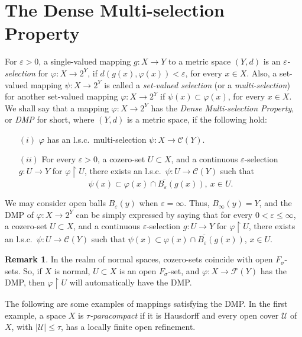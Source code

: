 \documentclass[12pt,a4paper,fleqn,leqno]{amsart}
\theoremstyle{plain}
\theoremstyle{definition}
\newtheorem{remark}[theorem]{Remark}
\numberwithin{equation}{section}
\begin{document}
\section{The Dense Multi-selection Property}
\label{dmp}

For $\varepsilon>0$, a single-valued mapping $g:X\to Y$ to a metric space $(Y,d)$ is an \emph{$\varepsilon$-selection} for $\varphi:X\to 2^Y$, if $d(g(x),\varphi(x))<\varepsilon$, for every $x\in X$. Also, a set-valued mapping $\psi:X\to 2^Y$ is called a \emph{set-valued selection} (or a \emph{multi-selection}) for another set-valued mapping $\varphi:X\to 2^Y$ if $\psi(x) \subset\varphi(x)$, for every $x\in X$. We shall say that a mapping $\varphi:X\to 2^Y$ has the \emph{Dense Multi-selection Property}, or \emph{DMP} for short, where $(Y,d)$ is a metric space, if the following hold:
\begin{enumerate}
\item[$(i)$] $\varphi$ has an l.s.c.\ multi-selection $\psi:X\to\mathscr{C}(Y)$.
\item[$(ii)$] For every $\varepsilon>0$, a cozero-set $U\subset X$, and a continuous $\varepsilon$-selection $g:U\to Y$ for $\varphi\operatorname{\upharpoonright} U$, there exists an l.s.c.\ $\psi:U\to\mathscr{C}(Y)$ such that
\[
\psi(x)\subset\overline{\varphi(x)\cap B_{\varepsilon}(g(x))},\ x\in U.
\]
\end{enumerate}

We may consider open balls $B_{\varepsilon}(y)$ when $\varepsilon=\infty$. Thus,
$B_{\infty}(y)=Y$, and the DMP of $\varphi:X\to 2^Y$ can be simply expressed by saying that for every $0<\varepsilon\leq\infty$, a cozero-set $U\subset X$, and a continuous $\varepsilon$-selection $g:U\to Y$ for $\varphi\operatorname{\upharpoonright} U$, there exists an l.s.c.\ $\psi:U\to\mathscr{C}(Y)$ such that $\psi(x)\subset\overline{\varphi(x)\cap B_{\varepsilon}(g(x))}$, $x\in U$.

\begin{remark}
\label{remark1}
In the realm of normal spaces, cozero-sets coincide with open $F_{\sigma}$-sets. So, if $X$ is normal, $U\subset X$ is an open $F_{\sigma}$-set, and $\varphi:X\to\mathscr{F}(Y)$ has the DMP, then $\varphi\operatorname{\upharpoonright} U$ will automatically have the DMP.
\end{remark}

The following are some examples of mappings satisfying the DMP. In the first example, a space $X$ is \emph{$\tau$-paracompact} if it is Hausdorff and every open cover $\mathscr{U}$ of $X$, with $|\mathscr{U}|\leq\tau$, has a locally finite open refinement.
\end{document}
